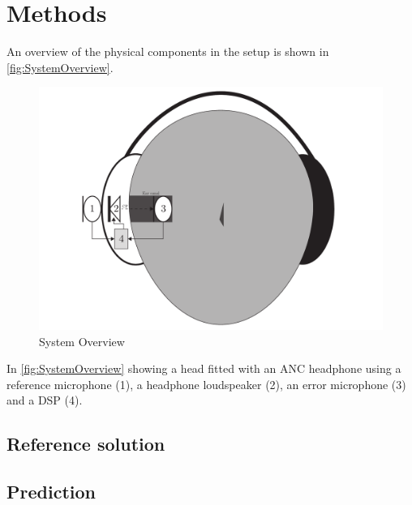 

\section{Methods}
An overview of the physical components in the setup is shown in \autoref{fig:SystemOverview}.
\begin{figure}[H]
	\centering
	\includegraphics[width=1\columnwidth]{figures/ArticleIllustrations/SystemOverview}
	\caption{System Overview}
	\label{fig:SystemOverview}
\end{figure}
In \autoref{fig:SystemOverview} showing a head fitted with an ANC headphone using a reference microphone (1), a headphone loudspeaker (2), an error microphone (3) and a DSP (4).  

\subsection*{Reference solution}
\subsection*{Prediction}